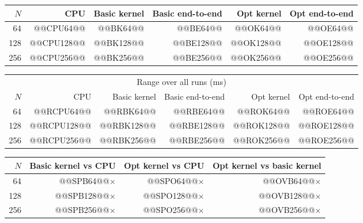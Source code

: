 \documentclass[11pt]{article}
\begin{document}
\begin{center}
\begin{tabular}{rrrrrr}
\toprule
$N$ & CPU & Basic kernel & Basic end-to-end & Opt kernel & Opt end-to-end \\
\midrule
64  & @@CPU64@@  & @@BK64@@  & @@BE64@@  & @@OK64@@  & @@OE64@@ \\
128 & @@CPU128@@ & @@BK128@@ & @@BE128@@ & @@OK128@@ & @@OE128@@ \\
256 & @@CPU256@@ & @@BK256@@ & @@BE256@@ & @@OK256@@ & @@OE256@@ \\
\bottomrule
\end{tabular}
\end{center}

\begin{center}
\small
\begin{tabular}{rrrrrr}
\toprule
\multicolumn{6}{c}{Range over all runs (ms)} \\
$N$ & CPU & Basic kernel & Basic end-to-end & Opt kernel & Opt end-to-end \\
\midrule
64  & @@RCPU64@@  & @@RBK64@@  & @@RBE64@@  & @@ROK64@@  & @@ROE64@@ \\
128 & @@RCPU128@@ & @@RBK128@@ & @@RBE128@@ & @@ROK128@@ & @@ROE128@@ \\
256 & @@RCPU256@@ & @@RBK256@@ & @@RBE256@@ & @@ROK256@@ & @@ROE256@@ \\
\bottomrule
\end{tabular}
\end{center}

\begin{center}
\begin{tabular}{rrrr}
\toprule
$N$ & Basic kernel vs CPU & Opt kernel vs CPU & Opt kernel vs basic kernel \\
\midrule
64  & @@SPB64@@$\times$  & @@SPO64@@$\times$  & @@OVB64@@$\times$ \\
128 & @@SPB128@@$\times$ & @@SPO128@@$\times$ & @@OVB128@@$\times$ \\
256 & @@SPB256@@$\times$ & @@SPO256@@$\times$ & @@OVB256@@$\times$ \\
\bottomrule
\end{tabular}
\end{center}
\end{document}

